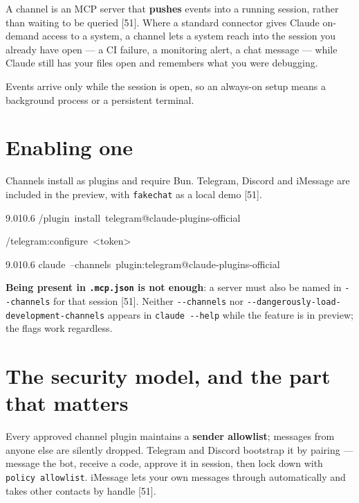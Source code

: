 \documentclass[11pt,a4paper,twoside,openany]{book}
\newcommand{\cl}[1]{\noindent\mbox{#1}\par}
\begin{document}
A channel is an MCP server that \textbf{pushes} events into a running session, rather than waiting to be queried [51]. Where a standard connector gives Claude on-demand access to a system, a channel lets a system reach into the session you already have open — a CI failure, a monitoring alert, a chat message — while Claude still has your files open and remembers what you were debugging.


Events arrive only while the session is open, so an always-on setup means a background process or a persistent terminal.


\FloatBarrier
\setcounter{section}{0}
\section{Enabling one}

Channels install as plugins and require Bun. Telegram, Discord and iMessage are included in the preview, with \texttt{fakechat} as a local demo [51].


\begin{codeblock}{9.0}{10.6}
\cl{/plugin~install~telegram@claude-plugins-official}
\cl{/telegram:configure~<token>}
\end{codeblock}

\begin{codeblock}{9.0}{10.6}
\cl{claude~--channels~plugin:telegram@claude-plugins-official}
\end{codeblock}

\textbf{Being present in \texttt{.\allowbreak{}mcp.\allowbreak{}json} is not enough}: a server must also be named in \texttt{-\allowbreak{}-\allowbreak{}channels} for that session [51]. Neither \texttt{-\allowbreak{}-\allowbreak{}channels} nor \texttt{-\allowbreak{}-\allowbreak{}dangerously-\allowbreak{}load-\allowbreak{}development-\allowbreak{}channels} appears in \texttt{claude -\allowbreak{}-\allowbreak{}help} while the feature is in preview; the flags work regardless.


\FloatBarrier
\setcounter{section}{1}
\section{The security model, and the part that matters}

Every approved channel plugin maintains a \textbf{sender allowlist}; messages from anyone else are silently dropped. Telegram and Discord bootstrap it by pairing — message the bot, receive a code, approve it in session, then lock down with \texttt{policy allo\allowbreak{}wlist}. iMessage lets your own messages through automatically and takes other contacts by handle [51].
\end{document}
